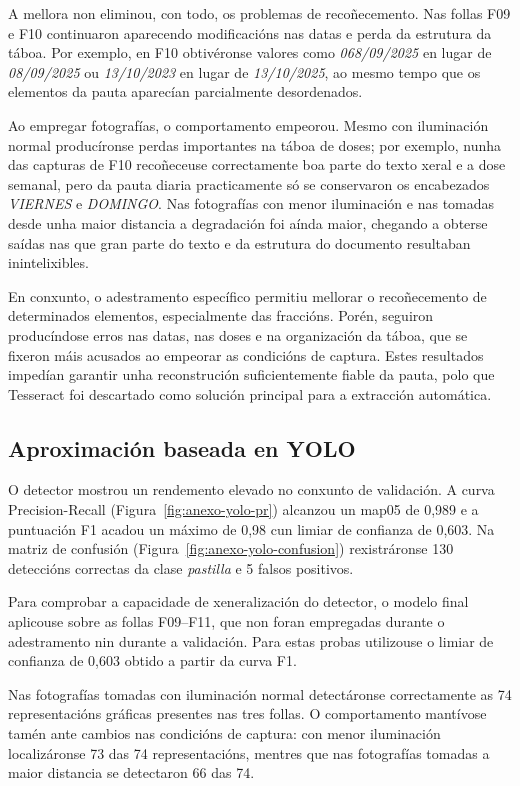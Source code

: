 A mellora non eliminou, con todo, os problemas de recoñecemento. Nas follas F09 e F10 continuaron aparecendo modificacións nas datas e perda da estrutura da táboa. Por exemplo, en F10 obtivéronse valores como \textit{068/09/2025} en lugar de \textit{08/09/2025} ou \textit{13/10/2023} en lugar de \textit{13/10/2025}, ao mesmo tempo que os elementos da pauta aparecían parcialmente desordenados.

Ao empregar fotografías, o comportamento empeorou. Mesmo con iluminación normal producíronse perdas importantes na táboa de doses; por exemplo, nunha das capturas de F10 recoñeceuse correctamente boa parte do texto xeral e a dose semanal, pero da pauta diaria practicamente só se conservaron os encabezados \textit{VIERNES} e \textit{DOMINGO}. Nas fotografías con menor iluminación e nas tomadas desde unha maior distancia a degradación foi aínda maior, chegando a obterse saídas nas que gran parte do texto e da estrutura do documento resultaban inintelixibles.

En conxunto, o adestramento específico permitiu mellorar o recoñecemento de determinados elementos, especialmente das fraccións. Porén, seguiron producíndose erros nas datas, nas doses e na organización da táboa, que se fixeron máis acusados ao empeorar as condicións de captura. Estes resultados impedían garantir unha reconstrución suficientemente fiable da pauta, polo que Tesseract foi descartado como solución principal para a extracción automática.

\subsection{Aproximación baseada en YOLO}

O detector mostrou un rendemento elevado no conxunto de validación. A curva Precision-Recall (Figura~\ref{fig:anexo-yolo-pr}) alcanzou un \gls{map05} de 0,989 e a puntuación F1 acadou un máximo de 0,98 cun limiar de confianza de 0,603. Na matriz de confusión (Figura~\ref{fig:anexo-yolo-confusion}) rexistráronse 130 deteccións correctas da clase \textit{pastilla} e 5 falsos positivos. 

Para comprobar a capacidade de xeneralización do detector, o modelo final aplicouse sobre as follas F09--F11, que non foran empregadas durante o adestramento nin durante a validación. Para estas probas utilizouse o limiar de confianza de 0,603 obtido a partir da curva F1.

Nas fotografías tomadas con iluminación normal detectáronse correctamente as 74 representacións gráficas presentes nas tres follas. O comportamento mantívose tamén ante cambios nas condicións de captura: con menor iluminación localizáronse 73 das 74 representacións, mentres que nas fotografías tomadas a maior distancia se detectaron 66 das 74.

